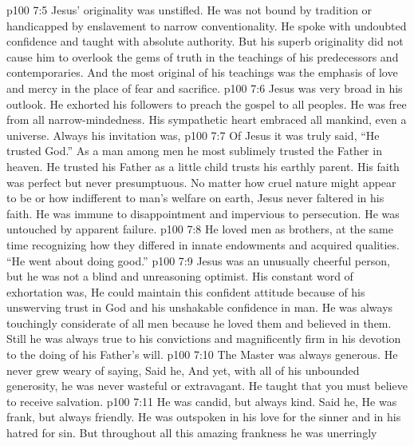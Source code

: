 \vs p100 7:5 Jesus’ originality was unstifled. He was not bound by tradition or handicapped by enslavement to narrow conventionality. He spoke with undoubted confidence and taught with absolute authority. But his superb originality did not cause him to overlook the gems of truth in the teachings of his predecessors and contemporaries. And the most original of his teachings was the emphasis of love and mercy in the place of fear and sacrifice.
\vs p100 7:6 Jesus was very broad in his outlook. He exhorted his followers to preach the gospel to all peoples. He was free from all narrow\hyp{}mindedness. His sympathetic heart embraced all mankind, even a universe. Always his invitation was, 
\vs p100 7:7 Of Jesus it was truly said, “He trusted God.” As a man among men he most sublimely trusted the Father in heaven. He trusted his Father as a little child trusts his earthly parent. His faith was perfect but never presumptuous. No matter how cruel nature might appear to be or how indifferent to man’s welfare on earth, Jesus never faltered in his faith. He was immune to disappointment and impervious to persecution. He was untouched by apparent failure.
\vs p100 7:8 He loved men as brothers, at the same time recognizing how they differed in innate endowments and acquired qualities. “He went about doing good.”
\vs p100 7:9 Jesus was an unusually cheerful person, but he was not a blind and unreasoning optimist. His constant word of exhortation was,  He could maintain this confident attitude because of his unswerving trust in God and his unshakable confidence in man. He was always touchingly considerate of all men because he loved them and believed in them. Still he was always true to his convictions and magnificently firm in his devotion to the doing of his Father’s will.
\vs p100 7:10 The Master was always generous. He never grew weary of saying,  Said he,  And yet, with all of his unbounded generosity, he was never wasteful or extravagant. He taught that you must believe to receive salvation. 
\vs p100 7:11 He was candid, but always kind. Said he,  He was frank, but always friendly. He was outspoken in his love for the sinner and in his hatred for sin. But throughout all this amazing frankness he was unerringly 
